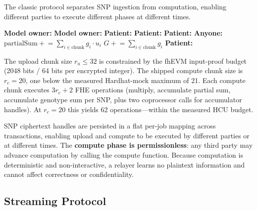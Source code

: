 \documentclass[10pt,twocolumn]{article}
\begin{document}
The classic protocol separates SNP ingestion from computation, enabling different
parties to execute different phases at different times.

\begin{algorithm}[t]
\caption{Classic chunked PRS computation (patient and relayer)}
\label{alg:classic}
\small
\begin{algorithmic}[1]
\State \textbf{Model owner:} 
\State \textbf{Model owner:} 
\State \textbf{Patient:} 
  \State \textbf{Patient:} 
\EndFor
\State \textbf{Patient:} 
  \State \textbf{Anyone:} 
  \State \quad $\mathrm{partialSum} \mathrel{+}= \sum_{i \in \mathrm{chunk}} g_i \cdot u_i$
  \State \quad $G \mathrel{+}= \sum_{i \in \mathrm{chunk}} g_i$
\EndFor
\State \textbf{Patient:} 
\end{algorithmic}
\end{algorithm}

The upload chunk size $r_u \leq 32$ is constrained by the fhEVM input-proof budget
(2048 bits / 64 bits per encrypted integer).  The shipped compute chunk size is
$r_c=20$, one below the measured Hardhat-mock maximum of 21.  Each compute chunk executes
$3r_c + 2$ FHE operations (multiply, accumulate partial sum, accumulate genotype sum
per SNP, plus two coprocessor calls for accumulator handles).  At $r_c = 20$ this
yields 62 operations---within the measured HCU budget.

SNP ciphertext handles are persisted in a flat per-job mapping across transactions,
enabling upload and compute to be executed by different parties or at different
times.  The \textbf{compute phase is permissionless}: any third party may advance
computation by calling the compute function.  Because computation is deterministic
and non-interactive, a relayer learns no plaintext information and cannot affect
correctness or confidentiality.

\subsection{Streaming Protocol}
\end{document}
